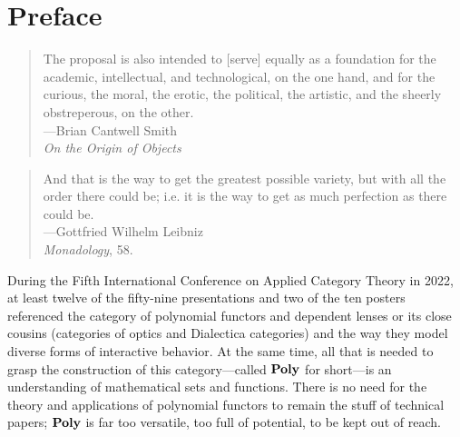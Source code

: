 \documentclass[Book-Poly]{subfiles}
\begin{document}
\chapter*{Preface}\label{chapter.0}

\begin{quote}
	The proposal is also intended to [serve] equally as a foundation for the academic, intellectual, and technological, on the one hand, and for the curious, the moral, the erotic, the political, the artistic, and the sheerly obstreperous, on the other.\\
\mbox{}\hfill ---Brian Cantwell Smith\\
\mbox{}\hfill \emph{On the Origin of Objects}
\end{quote}


\begin{quote}
And that is the way to get the greatest possible variety, but with all the order there could be; i.e. it is the way to get as much perfection as there could be.\\
\mbox{}\hfill ---Gottfried Wilhelm Leibniz\\
\mbox{}\hfill \emph{Monadology}, 58.
\end{quote}

\noindent During the Fifth International Conference on Applied Category Theory in 2022, at least twelve of the fifty-nine presentations and two of the ten posters referenced the category of polynomial functors and dependent lenses or its close cousins (categories of optics and Dialectica categories) and the way they model diverse forms of interactive behavior.
At the same time, all that is needed to grasp the construction of this category---called $\mathbf{Poly}$ for short---is an understanding of mathematical sets and functions.
There is no need for the theory and applications of polynomial functors to remain the stuff of technical papers; $\mathbf{Poly}$ is far too versatile, too full of potential, to be kept out of reach.
\end{document}
